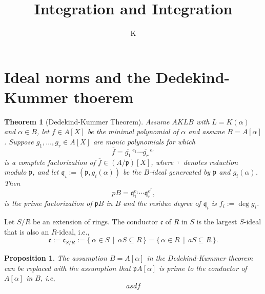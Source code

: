 \documentclass[a4paper]{book}
\title{Integration and Integration}
\author{K}
\theoremstyle{break}
\theoremstyle{plain}
\newtheorem{theorem}{Theorem}[definition]
\newtheorem{proposition}{Proposition}[definition]
\begin{document}
\section{Ideal norms and the Dedekind-Kummer thoerem}

\begin{theorem}[Dedekind-Kummer Theorem]
    Assume \(AKLB\) with \(L = K(\alpha)\) and \(\alpha \in B\), let \(f \in A[X]\) be the minimal polynomial of \(\alpha\) and assume \(B = A[\alpha]\). Suppose \(g_1, \ldots, g_r \in A[X]\) are monic polynomials for which
    \begin{equation}
        \overline{f} = \overline{g_1}\,^{e_1} \cdots \overline{g_r}\,^{e_r}
    \end{equation}
    is a complete factorization of \(\overline{f} \in (A / \mathfrak{p}) [X]\), where \(\overline{\cdot}\) denotes reduction modulo \(\mathfrak{p}\), and let \(\mathfrak{q}_i := (\mathfrak{p}, g_i(\alpha))\) be the \(B\)-ideal genereated by \(\mathfrak{p}\) and \(g_i (\alpha)\). Then
    \begin{equation}
        pB = \mathfrak{q}_1^{e_1} \cdots \mathfrak{q}_r^{e^r} \text{,}
    \end{equation}
    is the prime factorization of \(\mathfrak{p}B\) in \(B\) and the residue degree of \(\mathfrak{q}_i\) is \(f_i := \deg{g_i}\).
\end{theorem}

\begin{definition}[Conductor]
    Let \(S/R\) be an {\color{mathif}extension of rings}. The {\color{maththen}conductor} \(\mathfrak{c}\) of \(R\) in \(S\) is the {\color{mathif}largest \(S\)-ideal} that is also an {\color{mathif}\(R\)-ideal}, i.e.,
    \begin{equation}
        \mathfrak{c} := \mathfrak{c}_{S / R} := \{ \, \alpha \in S \, \mid \, \alpha S \subseteq R \, \} = \{ \, \alpha \in R \, \mid \, a S \subseteq R \, \} \text{.}
    \end{equation}
\end{definition}

\begin{proposition}
    The assumption \(B = A[\alpha]\) in the Dedekind-Kummer theorem can be replaced with the assumption that \(\mathfrak{p}A[\alpha]\) is prime to the conductor of \(A[\alpha]\) in \(B\), i.e,
    \begin{equation}
        asdf
    \end{equation}
\end{proposition}
\end{document}
